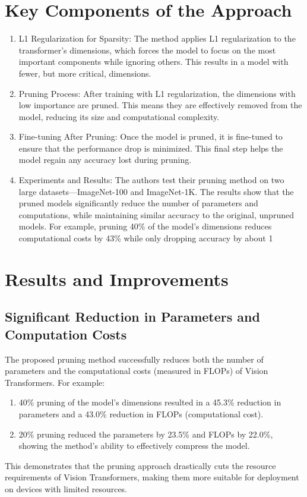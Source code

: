 \documentclass{report}
\begin{document}
	\section{Key Components of the Approach}
	\begin{enumerate}
		\item 
		L1 Regularization for Sparsity: The method applies L1 regularization to the transformer’s dimensions, which forces the model to focus on the most important components while ignoring others. This results in a model with fewer, but more critical, dimensions.
		
		\item 
		Pruning Process: After training with L1 regularization, the dimensions with low importance are pruned. This means they are effectively removed from the model, reducing its size and computational complexity.
		
		\item 
		Fine-tuning After Pruning: Once the model is pruned, it is fine-tuned to ensure that the performance drop is minimized. This final step helps the model regain any accuracy lost during pruning.
		
		\item 
		Experiments and Results: The authors test their pruning method on two large datasets—ImageNet-100 and ImageNet-1K. The results show that the pruned models significantly reduce the number of parameters and computations, while maintaining similar accuracy to the original, unpruned models. For example, pruning 40\% of the model’s dimensions reduces computational costs by 43\% while only dropping accuracy by about 1%
	\end{enumerate}
	
	
	\section{Results and Improvements}
	\subsection{Significant Reduction in Parameters and Computation Costs}
	The proposed pruning method successfully reduces both the number of parameters and the computational costs (measured in FLOPs) of Vision Transformers. For example:
	
	\begin{enumerate}
		\item 
		40\% pruning of the model’s dimensions resulted in a 45.3\% reduction in parameters and a 43.0\% reduction in FLOPs (computational cost).
		
		\item 
		20\% pruning reduced the parameters by 23.5\% and FLOPs by 22.0\%, showing the method’s ability to effectively compress the model.
	\end{enumerate}
	This demonstrates that the pruning approach drastically cuts the resource requirements of Vision Transformers, making them more suitable for deployment on devices with limited resources.
	
\end{document}
